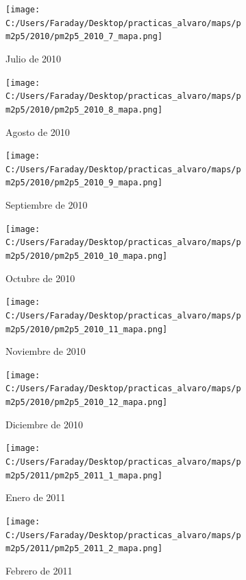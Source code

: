 \documentclass[12pt]{article}
\begin{document}
\newpage

\begin{figure}[H]
\centering
\begin{subfigure}[h]{0.45\textwidth}
\texttt{[image: C:/Users/Faraday/Desktop/practicas\_alvaro/maps/pm2p5/2010/pm2p5\_2010\_7\_mapa.png]}
\caption{Julio de 2010}
\label{fig:map-mon-4-7-2010}
\end{subfigure}
%
\begin{subfigure}[H]{0.45\textwidth}
\texttt{[image: C:/Users/Faraday/Desktop/practicas\_alvaro/maps/pm2p5/2010/pm2p5\_2010\_8\_mapa.png]}
\caption{Agosto de 2010}
\label{fig:map-mon-4-8-2010}
\end{subfigure}
\caption{}
\end{figure}

\begin{figure}[H]
\centering
\begin{subfigure}[h]{0.45\textwidth}
\texttt{[image: C:/Users/Faraday/Desktop/practicas\_alvaro/maps/pm2p5/2010/pm2p5\_2010\_9\_mapa.png]}
\caption{Septiembre de 2010}
\label{fig:map-mon-4-9-2010}
\end{subfigure}
%
\begin{subfigure}[H]{0.45\textwidth}
\texttt{[image: C:/Users/Faraday/Desktop/practicas\_alvaro/maps/pm2p5/2010/pm2p5\_2010\_10\_mapa.png]}
\caption{Octubre de 2010}
\label{fig:map-mon-4-10-2010}
\end{subfigure}
\caption{}
\end{figure}

\begin{figure}[H]
\centering
\begin{subfigure}[h]{0.45\textwidth}
\texttt{[image: C:/Users/Faraday/Desktop/practicas\_alvaro/maps/pm2p5/2010/pm2p5\_2010\_11\_mapa.png]}
\caption{Noviembre de 2010}
\label{fig:map-mon-4-11-2010}
\end{subfigure}
%
\begin{subfigure}[H]{0.45\textwidth}
\texttt{[image: C:/Users/Faraday/Desktop/practicas\_alvaro/maps/pm2p5/2010/pm2p5\_2010\_12\_mapa.png]}
\caption{Diciembre de 2010}
\label{fig:map-mon-4-12-2010}
\end{subfigure}
\caption{}
\end{figure}

\newpage

\begin{figure}[H]
\centering
\begin{subfigure}[h]{0.45\textwidth}
\texttt{[image: C:/Users/Faraday/Desktop/practicas\_alvaro/maps/pm2p5/2011/pm2p5\_2011\_1\_mapa.png]}
\caption{Enero de 2011}
\label{fig:map-mon-4-1-2011}
\end{subfigure}
%
\begin{subfigure}[H]{0.45\textwidth}
\texttt{[image: C:/Users/Faraday/Desktop/practicas\_alvaro/maps/pm2p5/2011/pm2p5\_2011\_2\_mapa.png]}
\caption{Febrero de 2011}
\label{fig:map-mon-4-2-2011}
\end{subfigure}
\caption{}
\end{figure}
\end{document}
